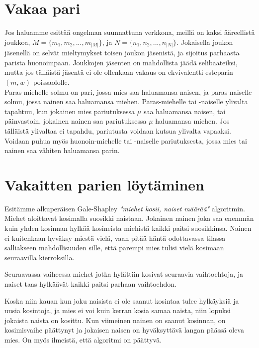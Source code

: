 \documentclass[finnish]{tktltiki2}
\theoremstyle{definition}
\theoremstyle{remark}
\begin{document}
\section{Vakaa pari}
Jos haluamme esittää ongelman suunnattuna verkkona, meillä on kaksi ääreellistä joukkoa, 
$M = \{m_{1}, m_{2},..., m_{|M|}\}$, ja $N = \{n_{1}, n_{2},...,n_{|N|}\}$. Jokaisella joukon jäsenellä on selvät mieltymykset toisen joukon jäsenistä, ja sijoitus parhaasta parista huonoimpaan. Joukkojen jäsenten on mahdollista jäädä selibaateiksi, mutta jos tälläistä jäsentä ei ole ollenkaan vakaus on ekvivalentti esteparin $(m, w)$ poissaololle.\\
Paras-miehelle solmu on pari, jossa mies saa haluamansa naisen, ja paras-naiselle solmu, jossa nainen saa haluamansa miehen. Paras-miehelle tai -naiselle ylivalta tapahtuu, kun jokainen mies pariutuksessa $\mu$ saa haluamansa naisen, tai päinvastoin, jokainen nainen saa pariutuksessa $\mu$ haluamansa miehen. Jos tälläistä ylivaltaa ei tapahdu, pariutusta voidaan kutsua ylivalta vapaaksi.\\
Voidaan puhua myös huonoin-miehelle tai -naiselle pariutuksesta, jossa mies tai nainen saa vähiten haluamansa parin.


\section{Vakaitten parien löytäminen}
Esitämme alkuperäisen Gale-Shapley \emph{"miehet kosii, naiset määrää"} algoritmin.
Miehet aloittavat kosimalla suosikki naistaan. Jokainen nainen joka saa enemmän kuin yhden kosinnan hylkää kosineista miehistä kaikki paitsi suosikkinsa. Nainen ei kuitenkaan hyväksy miestä vielä, vaan pitää häntä odottavassa tilassa salliakseen mahdollisuuden sille, että parempi mies tulisi vielä kosimaan seuraavilla kierroksilla.

Seuraavassa vaiheessa miehet jotka hylättiin kosivat seuraavia vaihtoehtoja, ja naiset taas hylkäävät kaikki paitsi parhaan vaihtoehdon.

Koska niin kauan kun joku naisista ei ole saanut kosintaa tulee hylkäyksiä ja uusia kosintoja, ja mies ei voi kuin kerran kosia samaa naista, niin lopuksi jokaista naista on kosittu. Kun viimeinen nainen on saanut kosinnan, on kosimisvaihe päättynyt ja jokaisen naisen on hyväksyttävä langan päässä oleva mies. \cite[p. 12-13]{gale62a} On myös ilmeistä, että algoritmi on päättyvä.
\end{document}
